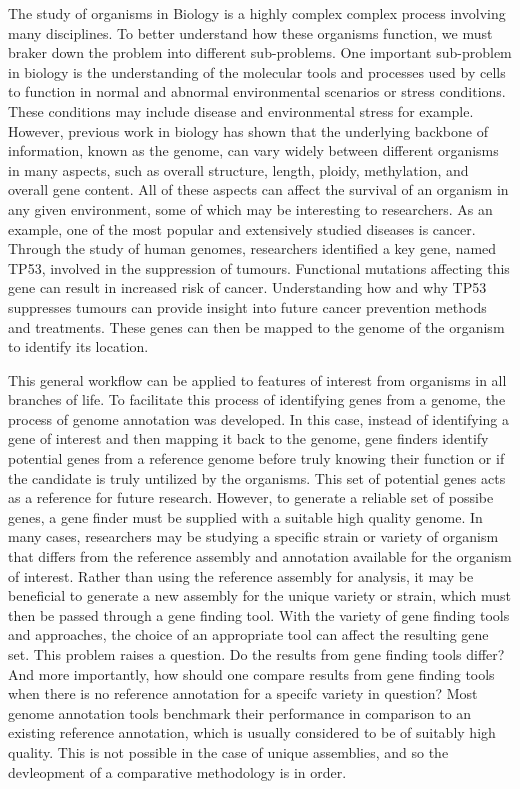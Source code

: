 The study of organisms in Biology is a highly complex complex process
involving many disciplines. To better understand how these organisms
function, we must braker down the problem into different
sub-problems. One important sub-problem in biology is the
understanding of the molecular tools and processes used by cells to
function in normal and abnormal environmental scenarios or stress
conditions. These conditions may include disease and environmental
stress for example. However, previous work in biology has shown that
the underlying backbone of information, known as the genome, can vary
widely between different organisms in many aspects, such as overall
structure, length, ploidy, methylation, and overall gene content. All
of these aspects can affect the survival of an organism in any given
environment, some of which may be interesting to researchers. As an
example, one of the most popular and extensively studied diseases is
cancer. Through the study of human genomes, researchers identified a
key gene, named TP53, involved in the suppression of
tumours. Functional mutations affecting this gene can result in
increased risk of cancer. Understanding how and why TP53 suppresses
tumours can provide insight into future cancer prevention methods and
treatments. These genes can then be mapped to the genome of the
organism to identify its location.

This general workflow can be applied to features of interest from
organisms in all branches of life. To facilitate this process of
identifying genes from a genome, the process of genome annotation was
developed. In this case, instead of identifying a gene of interest and
then mapping it back to the genome, gene finders identify potential
genes from a reference genome before truly knowing their function or
if the candidate is truly untilized by the organisms. This set of
potential genes acts as a reference for future research. However, to
generate a reliable set of possibe genes, a gene finder must be
supplied with a suitable high quality genome. In many cases,
researchers may be studying a specific strain or variety of organism
that differs from the reference assembly and annotation available for
the organism of interest. Rather than using the reference assembly for
analysis, it may be beneficial to generate a new assembly for the
unique variety or strain, which must then be passed through a gene
finding tool. With the variety of gene finding tools and approaches,
the choice of an appropriate tool can affect the resulting gene
set. This problem raises a question. Do the results from gene finding
tools differ? And more importantly, how should one compare results
from gene finding tools when there is no reference annotation for a
specifc variety in question? Most genome annotation tools benchmark
their performance in comparison to an existing reference annotation,
which is usually considered to be of suitably high quality. This is
not possible in the case of unique assemblies, and so the devleopment
of a comparative methodology is in order.
